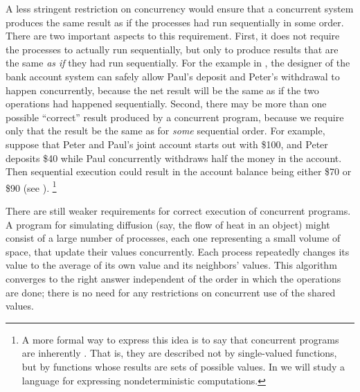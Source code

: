 A less stringent restriction on concurrency would ensure that a concurrent system produces the same result as if the processes had run sequentially in some order.
There are two important aspects to this requirement.
First, it does not require the processes to actually run sequentially, but only to produce results that are the same \emph{as if} they had run sequentially.
For the example in , the designer of the bank account system can safely allow Paul’s deposit and Peter’s withdrawal to happen concurrently, because the net result will be the same as if the two operations had happened sequentially.
Second, there may be more than one possible “correct” result produced by a concurrent program, because we require only that the result be the same as for \emph{some} sequential order.
For example, suppose that Peter and Paul’s joint account starts out with \$100, and Peter deposits \$40 while Paul concurrently withdraws half the money in the account.
Then sequential execution could result in the account balance being either \$70 or \$90 (see ).%
\footnote{
	\label{Footnote 39} A more formal way to express this idea is to say that concurrent programs are inherently .
	That is, they are described not by single-valued functions, but by functions whose results are sets of possible values.
	In  we will study a language for expressing nondeterministic computations.
}

There are still weaker requirements for correct execution of concurrent programs.
A program for simulating diffusion (say, the flow of heat in an object) might consist of a large number of processes, each one representing a small volume of space, that update their values concurrently.
Each process repeatedly changes its value to the average of its own value and its neighbors’ values.
This algorithm converges to the right answer independent of the order in which the operations are done;
there is no need for any restrictions on concurrent use of the shared values.



